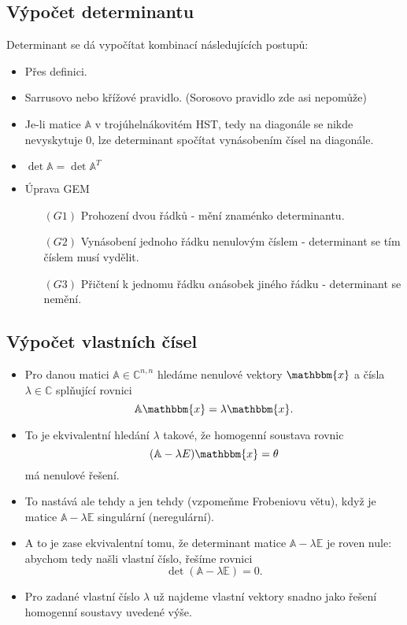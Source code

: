 \documentclass{szzclass}
\begin{document}
\subsection{Výpočet determinantu}
Determinant se dá vypočítat kombinací následujících postupů:
\begin{itemize}
\item Přes definici.
\item Sarrusovo nebo křížové pravidlo. (Sorosovo pravidlo zde asi nepomůže)
\item Je-li matice $\mathbb{A}$ v trojúhelnákovitém HST, tedy na diagonále se nikde nevyskytuje 0, lze determinant spočítat vynásobením čísel na diagonále.
\item $\det{\mathbb{A}}=\det{\mathbb{A}^T}$
\item Úprava GEM
  \begin{itemize}
  \item[$(G1)$] Prohození dvou řádků - mění znaménko determinantu.
  \item[$(G2)$] Vynásobení jednoho řádku nenulovým číslem - determinant se tím číslem musí vydělit.
  \item[$(G3)$] Přičtení k jednomu řádku $\alpha$násobek jiného řádku - determinant se nemění.
  \end{itemize}
\end{itemize}

\subsection{Výpočet vlastních čísel}

\begin{itemize}
\item Pro danou matici $\mathbb{A} \in \mathbb{C}^{n,n}$ hledáme nenulové vektory $\mathbbm{x}$ a čísla $\lambda\in\mathbb{C}$ splňující rovnici
\[
  \mathbb{A}\mathbbm{x} = \lambda \mathbbm{x}.
\]
\item To je ekvivalentní hledání $\lambda$ takové, že homogenní soustava rovnic
\[
  (\mathbb{A} - \lambda E)\mathbbm{x} = \theta
\]
má nenulové řešení.
\item To nastává ale tehdy a jen tehdy (vzpomeňme Frobeniovu větu), když je matice $\mathbb{A} - \lambda \mathbb{E}$ singulární (neregulární).
\item A to je zase ekvivalentní tomu, že determinant matice $\mathbb{A} - \lambda \mathbb{E}$ je roven nule: abychom tedy našli vlastní číslo, řešíme rovnici
\[
  \det(\mathbb{A} - \lambda \mathbb{E}) = 0.
\]
\item Pro zadané vlastní číslo $\lambda$ už najdeme vlastní vektory snadno jako řešení homogenní soustavy uvedené výše.
\end{itemize}
\end{document}

